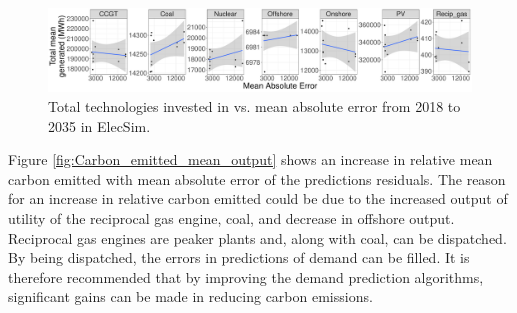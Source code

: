 \documentclass[final,3p,times,twocolumn,numbers]{elsarticle}
\begin{document}
\begin{figure}[h]
\includegraphics[width=\columnwidth,natwidth=700,natheight=300]{figures/results/total_total_plot.pdf}
\caption{Total technologies invested in vs. mean absolute error from 2018 to 2035 in ElecSim.}
\label{fig:ccgt_coal_onshore_offshore_totals}
\end{figure}





Figure \ref{fig:Carbon_emitted_mean_output} shows an increase in relative mean carbon emitted with mean absolute error of the predictions residuals. The reason for an increase in relative carbon emitted could be due to the increased output of utility of the reciprocal gas engine, coal, and decrease in offshore output. Reciprocal gas engines are peaker plants and, along with coal, can be dispatched. By being dispatched, the errors in predictions of demand can be filled. It is therefore recommended that by improving the demand prediction algorithms, significant gains can be made in reducing carbon emissions.



\end{document}
